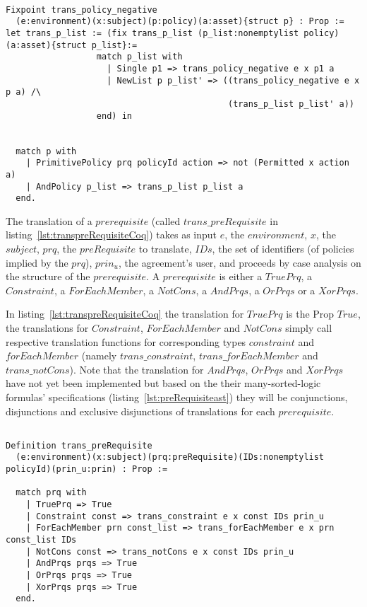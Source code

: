 \begin{minipage}[c]{0.95\textwidth}
\begin{lstlisting}

Fixpoint trans_policy_negative
  (e:environment)(x:subject)(p:policy)(a:asset){struct p} : Prop :=
let trans_p_list := (fix trans_p_list (p_list:nonemptylist policy)(a:asset){struct p_list}:=
                  match p_list with
                    | Single p1 => trans_policy_negative e x p1 a
                    | NewList p p_list' => ((trans_policy_negative e x p a) /\ 
                                            (trans_p_list p_list' a))
                  end) in


  match p with
    | PrimitivePolicy prq policyId action => not (Permitted x action a)
    | AndPolicy p_list => trans_p_list p_list a
  end.
\end{lstlisting}
\end{minipage}

The translation of a $prerequisite$ (called $trans\_preRequisite$ in listing~\ref{lst:transpreRequisiteCoq}) takes as input $e$, the $environment$, $x$, the $subject$, $prq$, the $preRequisite$ to translate, $IDs$, the set of identifiers (of policies implied by the $prq$), $prin_{u}$, the agreement's user, and proceeds by case analysis on the structure of the $prerequisite$. A $prerequisite$ is either a $TruePrq$, a $Constraint$, a $ForEachMember$, a $NotCons$, a $AndPrqs$, a $OrPrqs$ or a $XorPrqs$. 

In listing~\ref{lst:transpreRequisiteCoq} the translation for $TruePrq$ is the Prop $True$, the translations for $Constraint$, $ForEachMember$ and $NotCons$ simply call respective translation functions for corresponding types $constraint$ and $forEachMember$ (namely $trans\_constraint$, $trans\_forEachMember$ and $trans\_notCons$). Note that the translation for $AndPrqs$, $OrPrqs$ and $XorPrqs$ have not yet been implemented but based on the their many-sorted-logic formulas' specifications (listing~\ref{lst:preRequisiteast}) they will be conjunctions, disjunctions and exclusive disjunctions of translations for each $prerequisite$.

\begin{lstlisting}

Definition trans_preRequisite
  (e:environment)(x:subject)(prq:preRequisite)(IDs:nonemptylist policyId)(prin_u:prin) : Prop := 

  match prq with
    | TruePrq => True
    | Constraint const => trans_constraint e x const IDs prin_u 
    | ForEachMember prn const_list => trans_forEachMember e x prn const_list IDs 
    | NotCons const => trans_notCons e x const IDs prin_u 
    | AndPrqs prqs => True 
    | OrPrqs prqs => True 
    | XorPrqs prqs => True 
  end.
\end{lstlisting}

